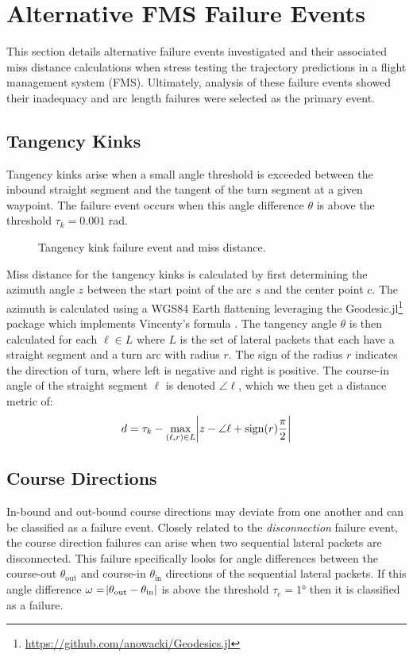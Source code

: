 \chapter{Alternative FMS Failure Events}\label{sec:application_events}
This section details alternative failure events investigated and their associated miss distance calculations when stress testing the trajectory predictions in a flight management system (FMS).
Ultimately, analysis of these failure events showed their inadequacy and arc length failures were selected as the primary event.

\section{Tangency Kinks}
Tangency kinks arise when a small angle threshold is exceeded between the inbound straight segment and the tangent of the turn segment at a given waypoint. The failure event occurs when this angle difference $\theta$ is above the threshold $\tau_k = 0.001$ \si{\radian}.

\begin{figure}[!ht]
\centering
\resizebox{0.5\columnwidth}{!}{}
\caption{Tangency kink failure event and miss distance.}
\label{fig:tangency_kink}
\end{figure}

Miss distance for the tangency kinks is calculated by first determining the azimuth angle $z$ between the start point of the arc $s$ and the center point $c$. The azimuth is calculated using a WGS84 Earth flattening leveraging the Geodesic.jl\footnote{\url{https://github.com/anowacki/Geodesics.jl}} package which implements Vincenty's formula  \cite{vincenty}. The tangency angle $\theta$ is then calculated for each $\ell \in L$ where $L$ is the set of lateral packets that each have a straight segment and a turn arc with radius $r$. The sign of the radius $r$ indicates the direction of turn, where left is negative and right is positive. The course-in angle of the straight segment $\ell$ is denoted $\angle \ell$, which we then get a distance metric of:
\begin{equation*}
    d = \tau_k - \max\limits_{(\ell,r) \in L} \abs{z - \angle \ell + \operatorname{sign}(r)\frac{\pi}{2}}
\end{equation*}
\phantom{}

\vspace{-6mm}
\section{Course Directions}
In-bound and out-bound course directions may deviate from one another and can be classified as a failure event.
Closely related to the \textit{disconnection} failure event, the course direction failures can arise when two sequential lateral packets are disconnected. This failure specifically looks for angle differences between the course-out $\theta_{\text{out}}$ and course-in $\theta_\text{in}$ directions of the sequential lateral packets. If this angle difference $\omega = \abs{\theta_\text{out} - \theta_\text{in}}$ is above the threshold $\tau_c = 1\si{\degree}$ then it is classified as a failure.

